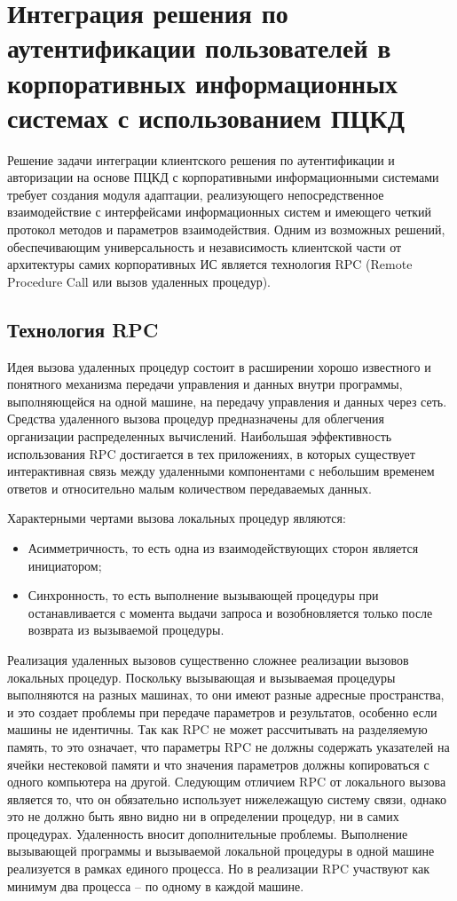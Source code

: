 \section{Интеграция решения по аутентификации пользователей в корпоративных
информационных системах с использованием ПЦКД}

Решение задачи интеграции клиентского решения по аутентификации и авторизации на
основе ПЦКД с корпоративными
информационными системами требует создания модуля адаптации, реализующего
непосредственное взаимодействие с интерфейсами информационных систем и имеющего
четкий протокол методов и параметров взаимодействия. Одним из возможных решений,
обеспечивающим универсальность и независимость клиентской части от архитектуры
самих корпоративных ИС является технология RPC (Remote Procedure Call или вызов
удаленных процедур).

\subsection{Технология RPC}
 
Идея вызова удаленных процедур состоит в расширении хорошо
известного и понятного механизма передачи управления и данных внутри программы,
выполняющейся на одной машине, на передачу управления и данных через сеть.
Средства удаленного вызова процедур предназначены для облегчения организации
распределенных вычислений. Наибольшая эффективность использования RPC
достигается в тех приложениях, в которых существует интерактивная связь между
удаленными компонентами с небольшим временем ответов и относительно малым
количеством передаваемых данных.

Характерными чертами вызова локальных процедур являются:
\begin{itemize}
  \item Асимметричность, то есть одна из взаимодействующих сторон является
инициатором;
\item Синхронность, то есть выполнение вызывающей процедуры при
останавливается с момента выдачи запроса и возобновляется только после возврата
из вызываемой процедуры.
\end{itemize}

Реализация удаленных вызовов существенно сложнее реализации вызовов локальных
процедур. Поскольку вызывающая и вызываемая процедуры выполняются на разных
машинах, то они имеют разные адресные пространства, и это создает проблемы при
передаче параметров и результатов, особенно если машины не идентичны. Так как
RPC не может рассчитывать на разделяемую память, то это означает, что параметры
RPC не должны содержать указателей на ячейки нестековой памяти и что значения
параметров должны копироваться с одного компьютера на другой. Следующим отличием
RPC от локального вызова является то, что он обязательно использует нижележащую
систему связи, однако это не должно быть явно видно ни в определении процедур,
ни в самих процедурах. Удаленность вносит дополнительные проблемы. Выполнение
вызывающей программы и вызываемой локальной процедуры в одной машине реализуется
в рамках единого процесса. Но в реализации RPC участвуют как минимум два
процесса -- по одному в каждой машине.~\cite{rpc}

